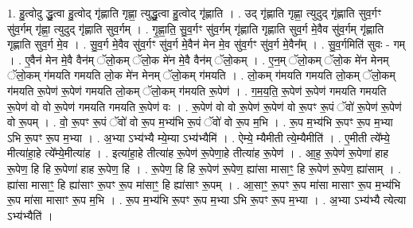 \documentclass[17pt]{extarticle}
\begin{document}
1. हु॒त्वोदु द्धु॒त्वा हु॒त्वोद् गृ॑ह्णाति गृह्णा॒ त्युद्धु॒त्वा हु॒त्वोद् गृ॑ह्णाति । . उद् गृ॑ह्णाति गृह्णा॒ त्युदुद् गृ॑ह्णाति सुव॒र्गꣳ सु॑व॒र्गम् गृ॑ह्णा॒ त्युदुद् गृ॑ह्णाति सुव॒र्गम् । . गृ॒ह्णा॒ति॒ सु॒व॒र्गꣳ सु॑व॒र्गम् गृ॑ह्णाति गृह्णाति सुव॒र्ग मे॒वैव सु॑व॒र्गम् गृ॑ह्णाति गृह्णाति सुव॒र्ग मे॒व । . सु॒व॒र्ग मे॒वैव सु॑व॒र्गꣳ सु॑व॒र्ग मे॒वैन॑ मेन मे॒व सु॑व॒र्गꣳ सु॑व॒र्ग मे॒वैन᳚म् । . सु॒व॒र्गमिति॑ सुवः - गम् । . ए॒वैन॑ मेन मे॒वै वैन॑म् ॅलो॒कम् ॅलो॒क मे॑न मे॒वै वैन॑म् ॅलो॒कम् । . ए॒न॒म् ॅलो॒कम् ॅलो॒क मे॑न मेनम् ॅलो॒कम् ग॑मयति गमयति लो॒क मे॑न मेनम् ॅलो॒कम् ग॑मयति । . लो॒कम् ग॑मयति गमयति लो॒कम् ॅलो॒कम् ग॑मयति रू॒पेण॑ रू॒पेण॑ गमयति लो॒कम् ॅलो॒कम् ग॑मयति रू॒पेण॑ । . ग॒म॒य॒ति॒ रू॒पेण॑ रू॒पेण॑ गमयति गमयति रू॒पेण॑ वो वो रू॒पेण॑ गमयति गमयति रू॒पेण॑ वः । . रू॒पेण॑ वो वो रू॒पेण॑ रू॒पेण॑ वो रू॒पꣳ रू॒पं ॅवो॑ रू॒पेण॑ रू॒पेण॑ वो रू॒पम् । . वो॒ रू॒पꣳ रू॒पं ॅवो॑ वो रू॒प म॒भ्य॑भि रू॒पं ॅवो॑ वो रू॒प म॒भि । . रू॒प म॒भ्य॑भि रू॒पꣳ रू॒प म॒भ्या ऽभि रू॒पꣳ रू॒प म॒भ्या । . अ॒भ्या ऽभ्य॑भ्यै म्ये॒म्या ऽभ्य॑भ्यैमि॑ । . ऐम्ये॒ म्यैमीती त्ये॒म्यैमीति॑ । . ए॒मीती त्ये᳚म्ये॒ मीत्या॑हा॒हे त्ये᳚म्ये॒मीत्या॑ह । . इत्या॑हा॒हे तीत्या॑ह रू॒पेण॑ रू॒पेणा॒हे तीत्या॑ह रू॒पेण॑ । . आ॒ह॒ रू॒पेण॑ रू॒पेणा॑ हाह रू॒पेण॒ हि हि रू॒पेणा॑ हाह रू॒पेण॒ हि । . रू॒पेण॒ हि हि रू॒पेण॑ रू॒पेण॒ ह्या॑सा मासाꣳ॒॒ हि रू॒पेण॑ रू॒पेण॒ ह्या॑साम् । . ह्या॑सा मासाꣳ॒॒ हि ह्या॑साꣳ रू॒पꣳ रू॒प मा॑साꣳ॒॒ हि ह्या॑साꣳ रू॒पम् । . आ॒साꣳ॒॒ रू॒पꣳ रू॒प मा॑सा मासाꣳ रू॒प म॒भ्य॑भि रू॒प मा॑सा मासाꣳ रू॒प म॒भि । . रू॒प म॒भ्य॑भि रू॒पꣳ रू॒प म॒भ्या ऽभि रू॒पꣳ रू॒प म॒भ्या । . अ॒भ्या ऽभ्य॑भ्यै त्येत्या ऽभ्य॑भ्यैति॑ । \newline
\end{document}
